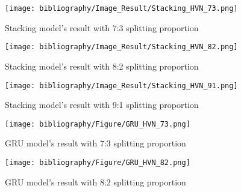 \documentclass{ieeeojies}
\begin{document}
\begin{figure}[H]
  \centering
  \begin{minipage}{0.8\linewidth}
    \centering
    \texttt{[image: bibliography/Image\_Result/Stacking\_HVN\_73.png]}
    \caption{Stacking model's result with 7:3 splitting proportion}
    \label{fig8}
  \end{minipage}
\end{figure}

\begin{figure}[H]
  \centering
  \begin{minipage}{0.8\linewidth}
    \centering
    \texttt{[image: bibliography/Image\_Result/Stacking\_HVN\_82.png]}
    \caption{Stacking model's result with 8:2 splitting proportion}
    \label{fig9}
  \end{minipage}
\end{figure}

\begin{figure}[H]
  \centering
  \begin{minipage}{0.8\linewidth}
    \centering
    \texttt{[image: bibliography/Image\_Result/Stacking\_HVN\_91.png]}
    \caption{Stacking model's result with 9:1 splitting proportion}
    \label{fig8}
  \end{minipage}
\end{figure}

\begin{figure}[H]
  \centering
  \begin{minipage}{0.8\linewidth}
    \centering
    \texttt{[image: bibliography/Figure/GRU\_HVN\_73.png]}
    \caption{GRU model's result with 7:3 splitting proportion}
    \label{fig9}
  \end{minipage}
\end{figure}

\begin{figure}[H]
  \centering
  \begin{minipage}{0.8\linewidth}
    \centering
    \texttt{[image: bibliography/Figure/GRU\_HVN\_82.png]}
    \caption{GRU model's result with 8:2 splitting proportion}
    \label{fig8}
  \end{minipage}
\end{figure}
\end{document}
